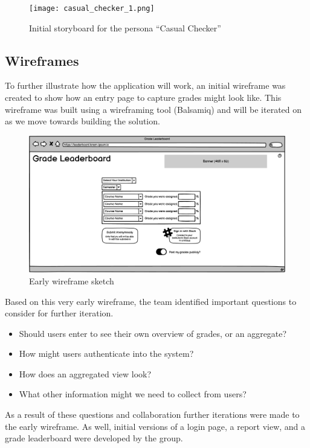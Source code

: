 \begin{figure}[H]
    \centering
    \texttt{[image: casual\_checker\_1.png]}
    \caption{Initial storyboard for the persona ``Casual Checker''}
    \label{fig:storyboard_casual}
\end{figure}

\subsection{Wireframes}
To further illustrate how the application will work, an initial wireframe was created to show how an entry page to capture grades might look like. This wireframe was built using a wireframing tool (Balsamiq)\cite{balsamiq} and will be iterated on as we move towards building the solution.

\begin{figure}[H]
    \centering
    \includegraphics[width=\textwidth]{images/Initial Page.png}
    \caption{Early wireframe sketch}
    \label{fig:earlywireframe}
\end{figure}

Based on this very early wireframe, the team identified important questions to consider for further iteration.

\begin{itemize}
    \item Should users enter to see their own overview of grades, or an aggregate?
    \item How might users authenticate into the system?
    \item How does an aggregated view look?
    \item What other information might we need to collect from users?
\end{itemize}

As a result of these questions and collaboration further iterations were made to the early wireframe. As well, initial versions of a login page, a report view, and a grade leaderboard were developed by the group.

